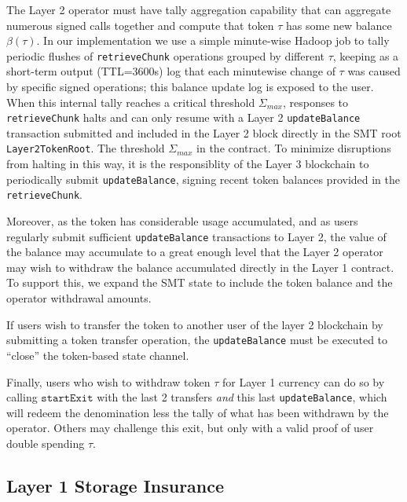 \documentclass{article}
\newcommand{\startexit}{\texttt{startExit}}
\newcommand{\balance}{\beta}
\begin{document}
The Layer 2 operator must have tally aggregation capability that can aggregate numerous signed calls together and compute that token $\tau$ has some new balance $\balance(\tau)$.  In our implementation we use a simple minute-wise Hadoop job to tally periodic flushes of \texttt{retrieveChunk} operations grouped by different $\tau$, keeping as a short-term output (TTL=3600s) log that each minutewise change of $\tau$ was caused by specific signed operations; this balance update log is exposed to the user.  When this internal tally reaches a critical threshold $\Sigma_{max}$, responses to \texttt{retrieveChunk} halts and can only resume with a Layer 2 \texttt{updateBalance} transaction submitted and included in the Layer 2 block directly in the SMT root \texttt{Layer2TokenRoot}.   The threshold $\Sigma_{max}$ in the contract.  To minimize disruptions from halting in this way, it is the responsiblity of the Layer 3 blockchain to periodically submit \texttt{updateBalance}, signing recent token balances provided in the  \texttt{retrieveChunk}.

Moreover, as the token has considerable usage accumulated, and as users regularly submit sufficient \texttt{updateBalance} transactions to Layer 2, the value of the balance may accumulate to a great enough level that the Layer 2 operator may wish to withdraw the balance accumulated directly in the Layer 1 contract.   To support this, we expand the SMT state to include the token balance and the operator withdrawal amounts.

If users wish to transfer the token to another user of the layer 2 blockchain by submitting a token transfer operation, the \texttt{updateBalance} must be executed to ``close'' the token-based state channel.

Finally, users who wish to withdraw token $\tau$ for Layer 1 currency can do so by calling $\startexit$ with the last 2 transfers {\em and} this last \texttt{updateBalance}, which will redeem the denomination less the tally of what has been withdrawn by the operator.  Others may challenge this exit, but only with a valid proof of user double spending $\tau$.

\subsection{Layer 1 Storage Insurance}
\end{document}
